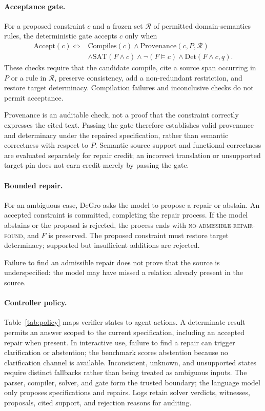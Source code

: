 \documentclass[sigconf,anonymous]{aamas}
\begin{document}
\paragraph{Acceptance gate.}
For a proposed constraint $c$ and a frozen set $\mathcal{R}$ of permitted domain-semantics rules, the deterministic gate accepts $c$ only when
\begin{align}
\mathrm{Accept}(c)\iff{}&\mathrm{Compiles}(c)\land
\mathrm{Provenance}(c,P,\mathcal{R})\nonumber\\
&\land\mathrm{SAT}(F\land c)\land\neg(F\models c)
\land\mathrm{Det}(F\land c,q).
\label{eq:accept}
\end{align}
These checks require that the candidate compile, cite a source span occurring in $P$ or a rule in $\mathcal{R}$, preserve consistency, add a non-redundant restriction, and restore target determinacy. Compilation failures and inconclusive checks do not permit acceptance.

Provenance is an auditable check, not a proof that the constraint correctly expresses the cited text. Passing the gate therefore establishes valid provenance and determinacy under the repaired specification, rather than semantic correctness with respect to $P$. Semantic source support and functional correctness are evaluated separately for repair credit; an incorrect translation or unsupported target pin does not earn credit merely by passing the gate.

\paragraph{Bounded repair.}
For an ambiguous case, DeGro asks the model to propose a repair or abstain. An accepted constraint is committed, completing the repair process. If the model abstains or the proposal is rejected, the process ends with \textsc{no-admissible-repair-found}, and $F$ is preserved. The proposed constraint must restore target determinacy; supported but insufficient additions are rejected.

Failure to find an admissible repair does not prove that the source is underspecified: the model may have missed a relation already present in the source.

\paragraph{Controller policy.}
Table~\ref{tab:policy} maps verifier states to agent actions. A determinate result permits an answer scoped to the current specification, including an accepted repair when present. In interactive use, failure to find a repair can trigger clarification or abstention; the benchmark scores abstention because no clarification channel is available. Inconsistent, unknown, and unsupported states require distinct fallbacks rather than being treated as ambiguous inputs. The parser, compiler, solver, and gate form the trusted boundary; the language model only proposes specifications and repairs. Logs retain solver verdicts, witnesses, proposals, cited support, and rejection reasons for auditing.
\end{document}
